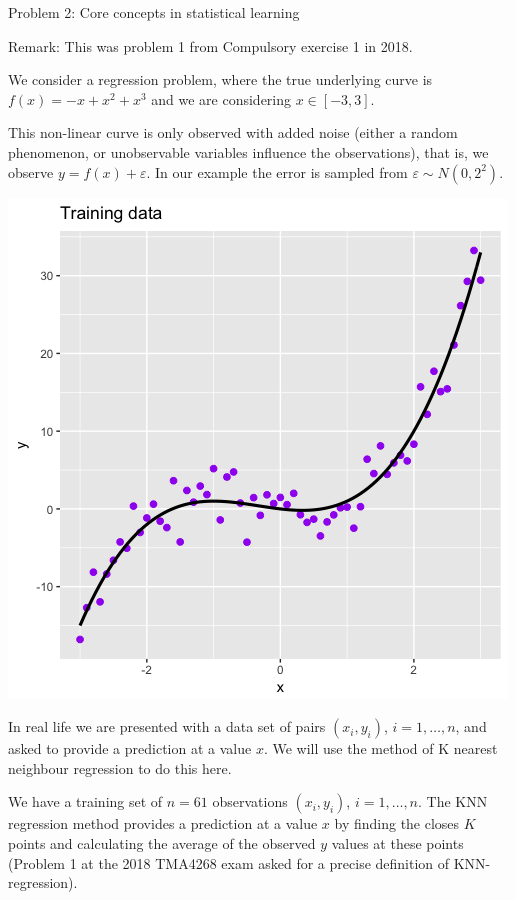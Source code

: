 \documentclass[ignorenonframetext,]{beamer}
\begin{document}
\begin{frame}

\begin{block}{Problem 2: Core concepts in statistical learning}

Remark: This was problem 1 from Compulsory exercise 1 in 2018.

We consider a regression problem, where the true underlying curve is
\(f(x)=-x+x^2+x^3\) and we are considering \(x \in [-3,3]\).

This non-linear curve is only observed with added noise (either a random
phenomenon, or unobservable variables influence the observations), that
is, we observe \(y=f(x)+\varepsilon\). In our example the error is
sampled from \(\varepsilon\sim N(0,2^2)\).

\includegraphics{Prob1f1.png}

In real life we are presented with a data set of pairs \((x_i,y_i)\),
\(i=1,\ldots,n\), and asked to provide a prediction at a value \(x\). We
will use the method of K nearest neighbour regression to do this here.

We have a training set of \(n=61\) observations \((x_i,y_i)\),
\(i=1,\ldots,n\). The KNN regression method provides a prediction at a
value \(x\) by finding the closes \(K\) points and calculating the
average of the observed \(y\) values at these points (Problem 1 at the
2018 TMA4268 exam asked for a precise definition of KNN-regression).


\end{block}
\end{frame}
\end{document}
